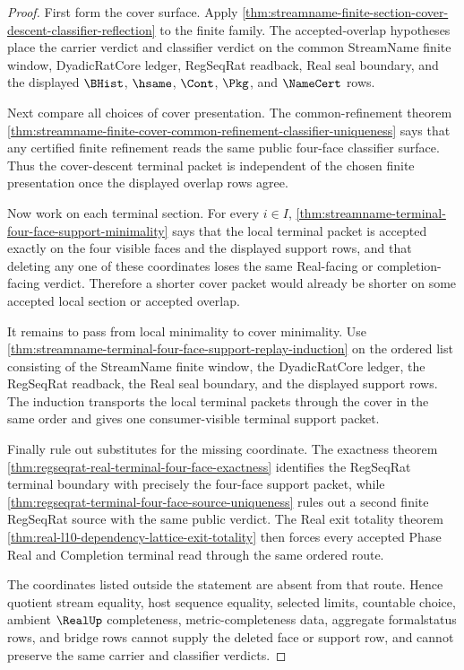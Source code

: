 \begin{proof}
First form the cover surface. Apply
\autoref{thm:streamname-finite-section-cover-descent-classifier-reflection} to
the finite family. The accepted-overlap hypotheses place the carrier verdict
and classifier verdict on the common StreamName finite window, DyadicRatCore
ledger, RegSeqRat readback, Real seal boundary, and the displayed $\BHist$,
$\hsame$, $\Cont$, $\Pkg$, and $\NameCert$ rows.

Next compare all choices of cover presentation. The common-refinement theorem
\autoref{thm:streamname-finite-cover-common-refinement-classifier-uniqueness}
says that any certified finite refinement reads the same public four-face
classifier surface. Thus the cover-descent terminal packet is independent of
the chosen finite presentation once the displayed overlap rows agree.

Now work on each terminal section. For every $i \in I$,
\autoref{thm:streamname-terminal-four-face-support-minimality} says that the
local terminal packet is accepted exactly on the four visible faces and the
displayed support rows, and that deleting any one of these coordinates loses
the same Real-facing or completion-facing verdict. Therefore a shorter cover
packet would already be shorter on some accepted local section or accepted
overlap.

It remains to pass from local minimality to cover minimality. Use
\autoref{thm:streamname-terminal-four-face-support-replay-induction} on the
ordered list consisting of the StreamName finite window, the DyadicRatCore
ledger, the RegSeqRat readback, the Real seal boundary, and the displayed
support rows. The induction transports the local terminal packets through the
cover in the same order and gives one consumer-visible terminal support packet.

Finally rule out substitutes for the missing coordinate. The exactness theorem
\autoref{thm:regseqrat-real-terminal-four-face-exactness} identifies the
RegSeqRat terminal boundary with precisely the four-face support packet, while
\autoref{thm:regseqrat-terminal-four-face-source-uniqueness} rules out a
second finite RegSeqRat source with the same public verdict. The Real exit
totality theorem
\autoref{thm:real-l10-dependency-lattice-exit-totality} then forces every
accepted Phase Real and Completion terminal read through the same ordered
route.

The coordinates listed outside the statement are absent from that route.
Hence quotient stream equality, host sequence equality, selected limits,
countable choice, ambient $\RealUp$ completeness, metric-completeness data,
aggregate formalstatus rows, and bridge rows cannot supply the deleted face or
support row, and cannot preserve the same carrier and classifier verdicts.
\end{proof}

